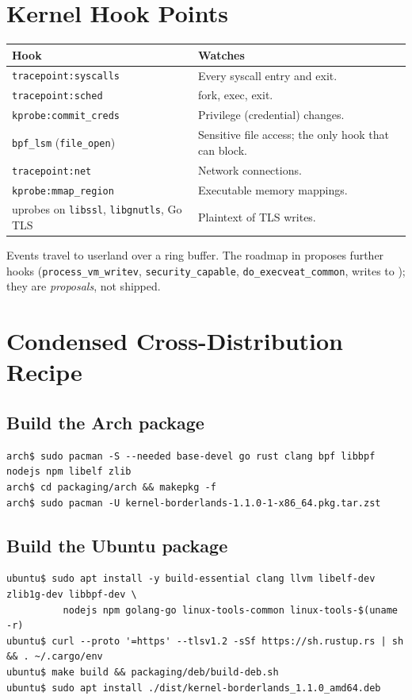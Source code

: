\chapter{Kernel Hook Points}
\begin{center}\small
\begin{tabularx}{\textwidth}{@{}L{4.6cm}Y@{}}
\toprule \textbf{Hook} & \textbf{Watches}\\ \midrule
\texttt{tracepoint:syscalls} & Every syscall entry and exit.\\
\texttt{tracepoint:sched} & fork, exec, exit.\\
\texttt{kprobe:commit\_creds} & Privilege (credential) changes.\\
\texttt{bpf\_lsm} (\texttt{file\_open}) & Sensitive file access; the only hook that can block.\\
\texttt{tracepoint:net} & Network connections.\\
\texttt{kprobe:mmap\_region} & Executable memory mappings.\\
uprobes on \texttt{libssl}, \texttt{libgnutls}, Go TLS & Plaintext of TLS writes.\\
\bottomrule
\end{tabularx}
\end{center}
Events travel to userland over a ring buffer. The roadmap in  proposes
further hooks (\texttt{process\_vm\_writev}, \texttt{security\_capable}, \texttt{do\_execveat\_common}, writes to
); they are \emph{proposals}, not shipped.

\chapter{Condensed Cross-Distribution Recipe}
\label{app:cross}
\section{Build the Arch package}
\begin{lstlisting}[style=console]
arch$ sudo pacman -S --needed base-devel go rust clang bpf libbpf nodejs npm libelf zlib
arch$ cd packaging/arch && makepkg -f
arch$ sudo pacman -U kernel-borderlands-1.1.0-1-x86_64.pkg.tar.zst
\end{lstlisting}
\section{Build the Ubuntu package}
\begin{lstlisting}[style=console]
ubuntu$ sudo apt install -y build-essential clang llvm libelf-dev zlib1g-dev libbpf-dev \
          nodejs npm golang-go linux-tools-common linux-tools-$(uname -r)
ubuntu$ curl --proto '=https' --tlsv1.2 -sSf https://sh.rustup.rs | sh && . ~/.cargo/env
ubuntu$ make build && packaging/deb/build-deb.sh
ubuntu$ sudo apt install ./dist/kernel-borderlands_1.1.0_amd64.deb
\end{lstlisting}
